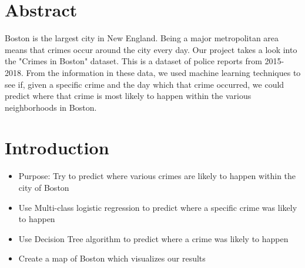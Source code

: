 \documentclass[a0,landscape]{a0poster}
\let\Section=\section
\def\section{\setcounter{equation}{0}\Section}
\newcommand{\1}{\bold{1}}
\begin{document}
\begin{multicols}{3} %

\vspace{0.05cm} %




\section*{Abstract}
Boston is the largest city in New England. Being a major metropolitan area means that crimes occur around the city every day. Our project takes a look into the "Crimes in Boston" dataset. This is a dataset of police reports from 2015-2018. From the information in these data, we used machine learning techniques to see if, given a specific crime and the day which that crime occurred, we could predict where that crime is most likely to happen within the various neighborhoods in Boston. 



\color{SaddleBrown} %




\color{black}\section{Introduction}
\begin{itemize}
\item Purpose: Try to predict where various crimes are likely to happen within the city of Boston
\item Use Multi-class logistic regression to predict where a specific crime was likely to happen
\item Use Decision Tree algorithm to predict where a crime was likely to happen
\item Create a map of Boston which visualizes our results 
\end{itemize}
\columnsep=5pt
\columnseprule=0pt




\end{multicols}
\end{document}
